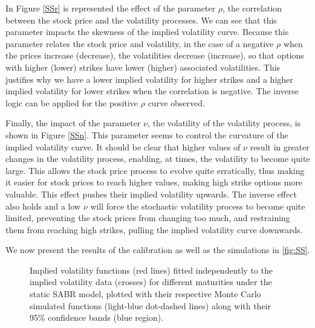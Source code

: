 In Figure \autoref{SSr} is represented the effect of the parameter $\rho$, the correlation between the stock price and the volatility processes.
We can see that this parameter impacts the skewness of the implied volatility curve. Because this parameter relates the stock price and volatility, in the case of a negative $\rho$ when the prices increase (decrease), the volatilities decrease (increase), so that options with higher (lower) strikes have lower (higher) associated volatilities. This justifies why we have a lower implied volatility for higher strikes and a higher implied volatility for lower strikes when the correlation is negative. The inverse logic can be applied for the positive $\rho$ curve observed.

Finally, the impact of the parameter $\nu$, the volatility of the volatility process, is shown in Figure \autoref{SSn}. This parameter seems to control the curvature of the implied volatility curve. It should be clear that higher values of $\nu$ result in greater changes in the volatility process, enabling, at times, the volatility to become quite large. This allows the stock price process to evolve quite erratically, thus making it easier for stock prices to reach higher values, making high strike options more valuable. This effect pushes their implied volatility upwards. The inverse effect also holds and a low $\nu$ will force the stochastic volatility process to become quite limited, preventing the stock prices from changing too much, and restraining them from reaching high strikes, pulling the implied volatility curve downwards.

\vfill
\newpage

We now present the results of the calibration as well as the simulations in \autoref{fig:SS}.



\begin{figure}[H]
  \begin{subfigmatrix}{2}
  \end{subfigmatrix}
  \caption[Implied volatility functions fitted independently to the implied volatility data for different maturities under the static SABR model, plotted with their respective Monte Carlo simulated functions along with their 95\% confidence bands.]{Implied volatility functions (red lines) fitted independently to the implied volatility data (crosses) for different maturities under the static SABR model, plotted with their respective Monte Carlo simulated functions (light-blue dot-dashed lines) along with their 95\% confidence bands (blue region).}
  \label{fig:SS}
\end{figure}

